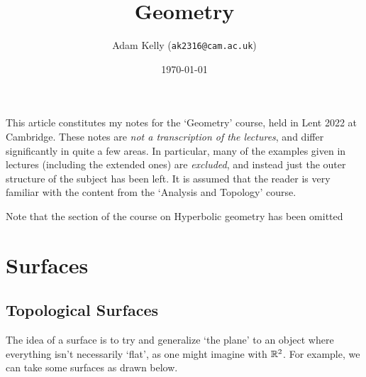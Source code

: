 \documentclass[a4paper]{article}
\title{Geometry}
\author{Adam Kelly (\texttt{ak2316@cam.ac.uk})}
\date{\today}
\begin{document}
\maketitle


This article constitutes my notes for the `Geometry' course, held in Lent 2022 at Cambridge. These notes are \emph{not a transcription of the lectures}, and differ significantly in quite a few areas. 
In particular, many of the examples given in lectures (including the extended ones) are \emph{excluded}, and instead just the outer structure of the subject has been left.
It is assumed that the reader is very familiar with the content from the `Analysis and Topology' course.

Note that the section of the course on Hyperbolic geometry has been omitted

\tableofcontents

\section{Surfaces}

\subsection{Topological Surfaces}

The idea of a surface is to try and generalize `the plane' to an object where everything isn't necessarily `flat', as one might imagine with $\mathbb{R}^2$. 
For example, we can take some surfaces as drawn below.
\end{document}
